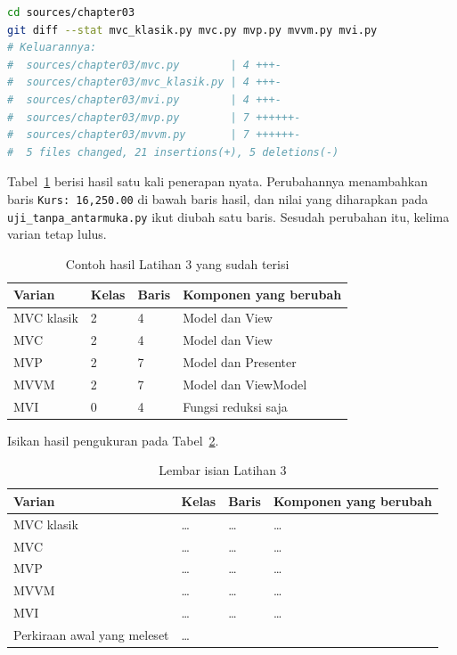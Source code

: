 \begin{lstlisting}[language=bash, caption={Menghitung baris yang berubah pada
  kelima \textit{file} varian di \berkas{sources/chapter03/}},
  label=lst:hitung-diff]
cd sources/chapter03
git diff --stat mvc_klasik.py mvc.py mvp.py mvvm.py mvi.py
# Keluarannya:
#  sources/chapter03/mvc.py        | 4 +++-
#  sources/chapter03/mvc_klasik.py | 4 +++-
#  sources/chapter03/mvi.py        | 4 +++-
#  sources/chapter03/mvp.py        | 7 ++++++-
#  sources/chapter03/mvvm.py       | 7 ++++++-
#  5 files changed, 21 insertions(+), 5 deletions(-)
\end{lstlisting}

Tabel~\ref{tab:lat3mv-contoh} berisi hasil satu kali penerapan nyata. Perubahannya
menambahkan baris \texttt{Kurs: 16,250.00} di bawah baris hasil, dan nilai yang
diharapkan pada \texttt{uji\_tanpa\_antarmuka.py} ikut diubah satu baris.
Sesudah perubahan itu, kelima varian tetap lulus.

\begin{table}[htbp]
  \centering
  \caption{Contoh hasil Latihan 3 yang sudah terisi}
  \label{tab:lat3mv-contoh}
  \begin{tabularx}{\textwidth}{|l|l|l|X|}
    \hline
    \textbf{Varian} & \textbf{Kelas} & \textbf{Baris} & \textbf{Komponen yang berubah} \\
    \hline
    MVC klasik & 2 & 4 & Model dan View \\
    \hline
    MVC & 2 & 4 & Model dan View \\
    \hline
    MVP & 2 & 7 & Model dan Presenter \\
    \hline
    MVVM & 2 & 7 & Model dan ViewModel \\
    \hline
    MVI & 0 & 4 & Fungsi reduksi saja \\
    \hline
  \end{tabularx}
\end{table}

Isikan hasil pengukuran pada Tabel~\ref{tab:lat3mv-hasil}.

\begin{table}[htbp]
  \centering
  \caption{Lembar isian Latihan 3}
  \label{tab:lat3mv-hasil}
  \begin{tabularx}{\textwidth}{|l|l|l|X|}
    \hline
    \textbf{Varian} & \textbf{Kelas} & \textbf{Baris} & \textbf{Komponen yang berubah} \\
    \hline
    MVC klasik & \dots & \dots & \dots \\
    \hline
    MVC & \dots & \dots & \dots \\
    \hline
    MVP & \dots & \dots & \dots \\
    \hline
    MVVM & \dots & \dots & \dots \\
    \hline
    MVI & \dots & \dots & \dots \\
    \hline
    Perkiraan awal yang meleset & \multicolumn{3}{l|}{\dots} \\
    \hline
  \end{tabularx}
\end{table}

